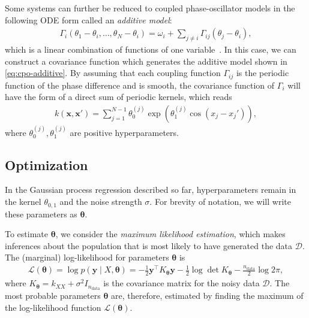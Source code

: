 Some systems can further be reduced to coupled phase-oscillator models in the following ODE form called an \textit{additive model}:
\begin{align}
    \Gamma_{i}(\theta_{1}-\theta_{i},\ldots,\theta_{N}-\theta_{i})=\omega_{i}+\sum_{j\ne i}\Gamma_{ij}(\theta_{j}-\theta_{i}),
    \label{eq:cpo-additive}
\end{align}
which is a linear combination of functions of one variable~\cite{duvenaud2011,rasumussen2006}.
In this case, we can construct a covariance function which generates the additive model shown in \eqref{eq:cpo-additive}.
By assuming that each coupling function $\Gamma_{ij}$ is the periodic function of the phase difference and is smooth,
the covariance function of $\Gamma_{i}$ will have the form of a direct sum of periodic kernels, which reads
\begin{align}
    k(\bm{x},\bm{x}')=\sum_{j=1}^{N-1}\theta_{0}^{(j)}\exp\left(\theta_{1}^{(j)}\cos(x_{j}-x_{j}')\right),
\end{align}
where $\theta_{0}^{(j)},\theta_{1}^{(j)}$ are positive hyperparameters.


\subsection{Optimization}
In the Gaussian process regression described so far,
hyperparameters remain in the kernel $\theta_{0,1}$ and the noise strength $\sigma$.
For brevity of notation, we will write these parameters as $\bm{\theta}$.

To estimate $\bm{\theta}$, we consider the \textit{maximum likelihood estimation},
which makes inferences about the population that is most likely to have generated the data $\mathcal{D}$.
The (marginal) log-likelihood for parameters $\bm{\theta}$ is
\begin{align}
    \mathcal{L}(\bm{\theta})=\log p(\bm{y}\mid X, \bm{\theta})=-\frac{1}{2}\bm{y}^{\top}K_{\bm{\theta}}\bm{y}-\frac{1}{2}\log\det K_{\bm{\theta}}-\frac{n_{\mathrm{data}}}{2}\log 2\pi,
\end{align}
where $K_{\bm{\theta}}=k_{XX}+\sigma^{2}I_{n_{\mathrm{data}}}$ is the covariance matrix for the noisy data $\mathcal{D}$.
The most probable parameters $\bm{\theta}$ are, therefore, estimated by finding the maximum of the log-likelihood function $\mathcal{L}(\bm{\theta})$.

